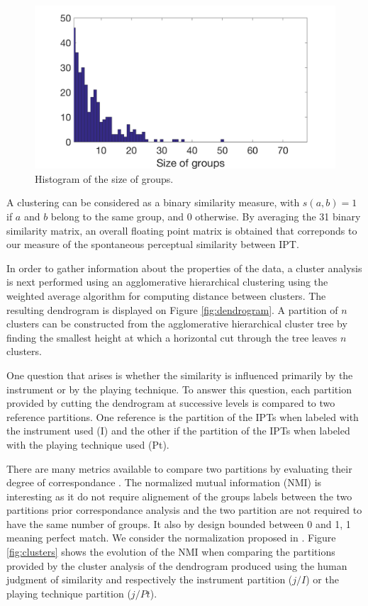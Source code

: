 \documentclass{article}
\newcommand{\ipt}{IPT\xspace}
\newcommand{\ipts}{IPTs\xspace}
\begin{document}
\begin{figure}
\center
\includegraphics[width = \textwidth]{figures/sbc.png}
\caption{Histogram of the size of groups.}
\label{fig:xp2sizeGroup}
\end{figure}

A clustering can be considered as a binary similarity measure, with $s(a, b) = 1$ if $a$ and $b$ belong to the same group, and $0$ otherwise. By averaging the 31 binary similarity matrix, an overall floating point matrix is obtained that correponds to our measure of the spontaneous perceptual similarity between \ipt.

In order to gather information about the properties of the data, a cluster analysis is next performed using an agglomerative hierarchical clustering \cite{gordon1987review} using the weighted average algorithm for computing distance between clusters. The resulting dendrogram is displayed on Figure \ref{fig:dendrogram}. A partition of $n$ clusters can be constructed from the agglomerative hierarchical cluster tree by finding the smallest height at which a horizontal cut through the tree leaves $n$ clusters.

One question that arises is whether the similarity is influenced primarily by the instrument or by the playing technique. To answer this question, each partition provided by cutting the dendrogram at successive levels is compared to two reference partitions. One reference is the partition of the \ipts when labeled with the instrument used (I) and the other if the partition of the \ipts when labeled with the playing technique used (Pt).

There are many metrics available to compare two partitions by evaluating their degree of correspondance \cite{wagner2007comparing}. The normalized mutual information (NMI) is interesting as it do not require alignement of the groups labels between the two partitions prior correspondance analysis and the two partition are not required to have the same number of groups. It also by design bounded between 0 and 1, 1 meaning perfect match. We consider the normalization proposed in \cite{strehl2002cluster}. Figure \ref{fig:clusters} shows the evolution of the NMI when comparing the partitions provided by the cluster analysis of the dendrogram produced using the human judgment of similarity and respectively the instrument partition ($j/I$) or the playing technique partition ($j/Pt$).
\end{document}
